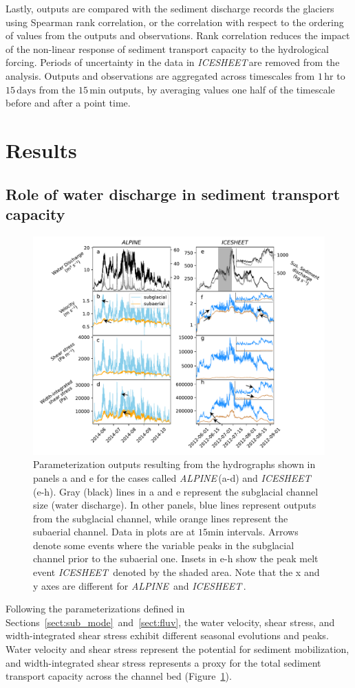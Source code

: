 \documentclass[draft]{agujournal2019}
\newcommand{\alpine}{\textit{ALPINE}\,}
\newcommand{\icesheet}{\textit{ICESHEET}\,}
\newcommand{\unit}[1]{$\mathrm{#1}$}
\begin{document}
Lastly,  outputs are compared with the sediment discharge records the glaciers using Spearman rank correlation, or the correlation with respect to the ordering of values from the outputs and observations.
Rank correlation reduces the impact of the non-linear response of sediment transport capacity to the hydrological forcing.
Periods of uncertainty in the data in \icesheet are removed from the analysis.
Outputs and observations are aggregated across timescales from $1$\,\unit{hr} to $15$\,\unit{days} from the $15$\,\unit{min} outputs, by averaging values one half of the timescale before and after a point time.


\section{Results}

\subsection{Role of water discharge in sediment transport capacity}
\begin{figure}[h]
  \centering
  \includegraphics[width=0.9\linewidth]{Fig2.pdf}
  \caption{Parameterization outputs resulting from the hydrographs shown in panels a and e for the cases called \alpine (a-d) and \icesheet{} (e-h). Gray (black) lines in a and e represent the subglacial channel size (water discharge).  In other panels, blue lines represent outputs from the subglacial channel, while orange lines represent the subaerial channel.
    Data in plots are at $15$\unit{min} intervals.
    Arrows denote some events where the variable peaks in the subglacial channel prior to the subaerial one.
    Insets in e-h show the  peak melt event \icesheet{} denoted by the shaded area.
    Note that the x and y axes are different for \alpine{} and \icesheet{}.
      }
  \label{fig:model_outs}
\end{figure}
Following the parameterizations defined in Sections~\ref{sect:sub_mode}~and~\ref{sect:fluv}, the water velocity, shear stress, and width-integrated shear stress exhibit different seasonal evolutions and peaks. Water velocity and shear stress represent the potential for sediment mobilization, and width-integrated shear stress represents a proxy for the total sediment transport capacity across the channel bed (Figure~\ref{fig:model_outs}).
\end{document}

